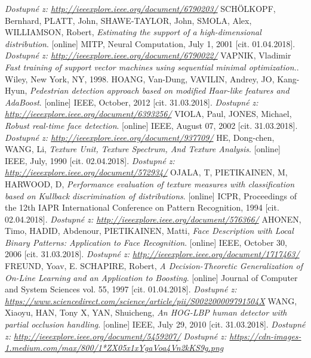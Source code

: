 \begin{thebibliography}{99}
 		\textit{Dostupné z: \url{http://ieeexplore.ieee.org/document/6790203/}}
 	 SCHÖLKOPF, Bernhard, PLATT, John, SHAWE-TAYLOR, John, SMOLA, Alex, WILLIAMSON, Robert, \textit{Estimating the support of a high-dimensional distribution}. [online] MITP, Neural Computation, July 1, 2001 [cit. 01.04.2018]. 
 		\textit{Dostupné z: \url{http://ieeexplore.ieee.org/document/6790022/}}
 	 VAPNIK, Vladimir \textit{Fast training of support vector machines using sequential minimal optimization.}. Wiley, New York, NY, 1998. 
 	 HOANG, Van-Dung, VAVILIN, Andrey, JO, Kang-Hyun, \textit{Pedestrian detection approach based on modified Haar-like features and AdaBoost}. [online] IEEE, October, 2012 [cit. 31.03.2018]. 
 		\textit{Dostupné z: \url{http://ieeexplore.ieee.org/document/6393256/}}
 	 VIOLA, Paul, JONES, Michael, \textit{Robust real-time face detection}. [online] IEEE, August 07, 2002 [cit. 31.03.2018]. 
 		\textit{Dostupné z: \url{http://ieeexplore.ieee.org/document/937709/}}
 	 HE, Dong-chen, WANG, Li, \textit{Texture Unit, Texture Spectrum, And Texture Analysis}. [online] IEEE, July, 1990 [cit. 02.04.2018]. 
 		\textit{Dostupné z: \url{http://ieeexplore.ieee.org/document/572934/}}
 	 OJALA, T, PIETIKAINEN, M, HARWOOD, D, \textit{Performance evaluation of texture measures with classification based on Kullback discrimination of distributions}. [online] ICPR, Proceedings of the 12th IAPR International Conference on Pattern Recognition, 1994 [cit. 02.04.2018]. 
 		\textit{Dostupné z: \url{http://ieeexplore.ieee.org/document/576366/}}
	 AHONEN, Timo, HADID, Abdenour, PIETIKAINEN, Matti, \textit{Face Description with Local Binary Patterns: Application to Face Recognition}. [online] IEEE, October 30, 2006 [cit. 31.03.2018]. 
 		\textit{Dostupné z: \url{http://ieeexplore.ieee.org/document/1717463/}}
 	 FREUND, Yoav, E. SCHAPIRE, Robert, \textit{A Decision-Theoretic Generalization of On-Line Learning and an Application to Boosting}. [online] Journal of Computer and System Sciences vol. 55, 1997 [cit. 01.04.2018]. 
 		\textit{Dostupné z: \url{https://www.sciencedirect.com/science/article/pii/S002200009791504X}}
 	 WANG, Xiaoyu, HAN, Tony X, YAN, Shuicheng, \textit{An HOG-LBP human detector with partial occlusion handling}. [online] IEEE, July 29, 2010 [cit. 31.03.2018]. 
 	\textit{Dostupné z: \url{http://ieeexplore.ieee.org/document/5459207/}}
	 \textit{Dostupné z: \url{https://cdn-images-1.medium.com/max/800/1*ZX05x1xYgaVoa4Vn2kKS9g.png}}

\end{thebibliography}
